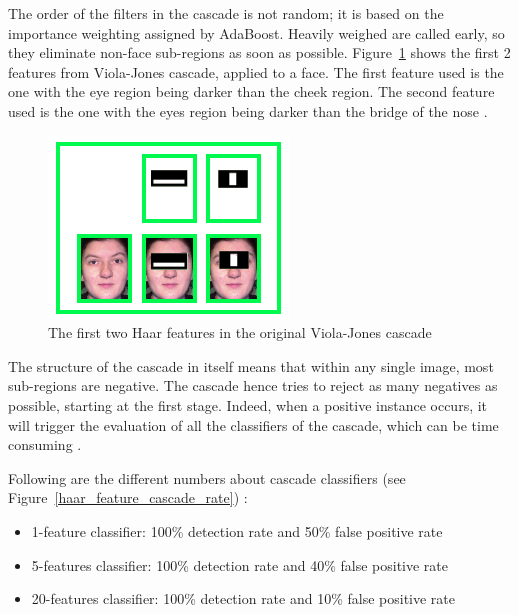 \noindent The order of the filters in the cascade is not random; it is based on the importance weighting assigned by AdaBoost. Heavily weighed are called early, so they eliminate non-face sub-regions as soon as possible. Figure~\ref{haar_feature_first_2_features} shows the first 2 features from Viola-Jones cascade, applied to a face. The first feature used is the one with the eye region being darker than the cheek region. The second feature used is the one with the eyes region being darker than the bridge of the nose \cite{HEW07}.
\newline

\begin{figure}[!h]
\begin{center}
\noindent \includegraphics[scale=1]{figures/haar_feature_first_2_features} 
\newline
\caption{The first two Haar features in the original Viola-Jones cascade}
\label{haar_feature_first_2_features}
\end{center} 
\end{figure}

\noindent The structure of the cascade in itself means that within any single image, most sub-regions are negative. The cascade hence tries to reject as many negatives as possible, starting at the first stage. Indeed, when a positive instance occurs, it will trigger the evaluation of all the classifiers of the cascade, which can be time consuming \cite{VIO01}.
\newline

\noindent Following are the different numbers about cascade classifiers (see Figure~\ref{haar_feature_cascade_rate}) \cite{UBC01}:

\begin{itemize}
  \item 1-feature classifier: 100\% detection rate and 50\% false positive rate
  \item 5-features classifier: 100\% detection rate and 40\% false positive rate 
  \item 20-features classifier: 100\% detection rate and 10\% false positive rate
\end{itemize}

